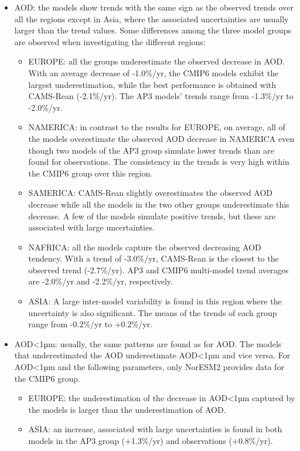 \documentclass[acp, manuscript]{copernicus}
\begin{document}
\begin{itemize}
 \item AOD: the models show trends with the same sign as the observed trends over all the regions except in Asia, where the associated uncertainties are usually larger than the trend values. Some differences among the three model groups are observed when investigating the different regions:
       \begin{itemize}
        \item EUROPE: all the groups underestimate the observed decrease in AOD. With an average decrease of -1.0\%/yr, the CMIP6 models exhibit the largest underestimation, while the best performance is obtained with CAMS-Rean (-2.1\%/yr). The AP3 models' trends range from -1.3\%/yr to -2.0\%/yr.
        \item NAMERICA: in contrast to the results for EUROPE, on average, all of the models overestimate the observed AOD decrease in NAMERICA even though two models of the AP3 group simulate lower trends than are found for observations. The consistency in the trends is very high within the CMIP6 group over this region.
        \item SAMERICA: CAMS-Rean slightly overestimates the observed AOD decrease while all the models in the two other groups underestimate this decrease. A few of the models simulate positive trends, but these are associated with large uncertainties.
        \item NAFRICA: all the models capture the observed decreasing AOD tendency. With a trend of -3.0\%/yr, CAMS-Rean is the closest to the observed trend (-2.7\%/yr). AP3 and CMIP6 multi-model trend averages are -2.0\%/yr and -2.2\%/yr, respectively.
        \item ASIA: A large inter-model variability is found in this region where the uncertainty is also significant. The means of the trends of each group range from -0.2\%/yr to +0.2\%/yr.
       \end{itemize}
 \item AOD<1µm: usually, the same patterns are found as for AOD. The models that underestimated the AOD underestimate AOD<1µm and vice versa. For AOD<1µm and the following parameters, only NorESM2 provides data for the CMIP6 group.
       \begin{itemize}
        \item EUROPE: the underestimation of the decrease in AOD<1µm captured by the models is larger than the underestimation of AOD.
        \item ASIA: an increase, associated with large uncertainties is found in both models in the AP3 group (+1.3\%/yr) and observations (+0.8\%/yr).

\end{itemize}
\end{itemize}
\end{document}

